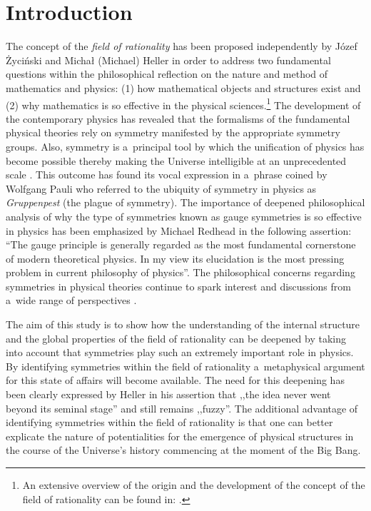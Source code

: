 \section{Introduction}

The concept of the \textit{field of rationality} has been proposed independently by Józef Życiński and Michał (Michael) Heller in order to address two fundamental questions within the philosophical reflection on the nature and method of mathematics and physics: (1) how mathematical objects and structures exist and (2) why mathematics is so effective in the physical sciences.\footnote{An extensive overview of the origin and the development of the concept of the field of rationality can be found in: 
\parencites[][]{pabjan_jozefa_2011}[][]{grygiel_critical_2022}. %
 } The development of the contemporary physics has revealed that the formalisms of the fundamental physical theories rely on symmetry manifested by the appropriate symmetry groups. Also, symmetry is a~principal tool by which the unification of physics has become possible thereby making the Universe intelligible at an unprecedented scale 
\parencite[e.g][]{gross_role_1996}. %
 This outcome has found its vocal expression in a~phrase coined by Wolfgang Pauli who referred to the ubiquity of symmetry in physics as \textit{Gruppenpest} (the plague of symmetry). The importance of deepened philosophical analysis of why the type of symmetries known as gauge symmetries is so effective in physics has been emphasized by Michael Redhead 
\parencite*[][p.138]{brading_interpretation_2003} %
 in the following assertion: ``The gauge principle is generally regarded as the most fundamental cornerstone of modern theoretical physics. In my view its elucidation is the most pressing problem in current philosophy of physics''. The philosophical concerns regarding symmetries in physical theories continue to spark interest and discussions from a~wide range of perspectives 
\parencite[e.g][]{dardashti_editorial_2021}.%




The aim of this study is to show how the understanding of the internal structure and the global properties of the field of rationality can be deepened by taking into account that symmetries play such an extremely important role in physics. By identifying symmetries within the field of rationality a~metaphysical argument for this state of affairs will become available. The need for this deepening has been clearly expressed by Heller 
\parencite*[][p.442]{heller_field_2014} %
 in his assertion that ,,the idea never went beyond its seminal stage'' and still remains ,,fuzzy''. The additional advantage of identifying symmetries within the field of rationality is that one can better explicate the nature of potentialities for the emergence of physical structures in the course of the Universe's history commencing at the moment of the Big Bang.



